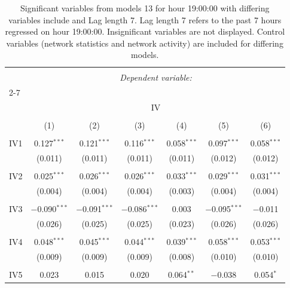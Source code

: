 
\begin{table}[!htbp] \centering 
  \caption{Significant variables from models 13 for hour 19:00:00 with differing variables include 
                               and Lag length 7. Lag length 7 refers to the past 7 hours regressed on hour 19:00:00. 
                               Insignificant variables are not displayed. 
                               Control variables (network statistics and network activity) are 
                               included for differing models.} 
  \label{IVmodels1_t_hourlagged6} 
\scriptsize 
\begin{tabular}{@{\extracolsep{5pt}}lcccccc} 
\\[-1.8ex]\hline 
\hline \\[-1.8ex] 
 & \multicolumn{6}{c}{\textit{Dependent variable:}} \\ 
\cline{2-7} 
\\[-1.8ex] & \multicolumn{6}{c}{IV} \\ 
\\[-1.8ex] & (1) & (2) & (3) & (4) & (5) & (6)\\ 
\hline \\[-1.8ex] 
 IV1 & 0.127$^{***}$ & 0.121$^{***}$ & 0.116$^{***}$ & 0.058$^{***}$ & 0.097$^{***}$ & 0.058$^{***}$ \\ 
  & (0.011) & (0.011) & (0.011) & (0.011) & (0.012) & (0.012) \\ 
  & & & & & & \\ 
 IV2 & 0.025$^{***}$ & 0.026$^{***}$ & 0.026$^{***}$ & 0.033$^{***}$ & 0.029$^{***}$ & 0.031$^{***}$ \\ 
  & (0.004) & (0.004) & (0.004) & (0.003) & (0.004) & (0.004) \\ 
  & & & & & & \\ 
 IV3 & $-$0.090$^{***}$ & $-$0.091$^{***}$ & $-$0.086$^{***}$ & 0.003 & $-$0.095$^{***}$ & $-$0.011 \\ 
  & (0.026) & (0.025) & (0.025) & (0.023) & (0.026) & (0.026) \\ 
  & & & & & & \\ 
 IV4 & 0.048$^{***}$ & 0.045$^{***}$ & 0.044$^{***}$ & 0.039$^{***}$ & 0.058$^{***}$ & 0.053$^{***}$ \\ 
  & (0.009) & (0.009) & (0.009) & (0.008) & (0.010) & (0.010) \\ 
  & & & & & & \\ 
 IV5 & 0.023 & 0.015 & 0.020 & 0.064$^{**}$ & $-$0.038 & 0.054$^{*}$ \\ 

\end{tabular}
\end{table}
